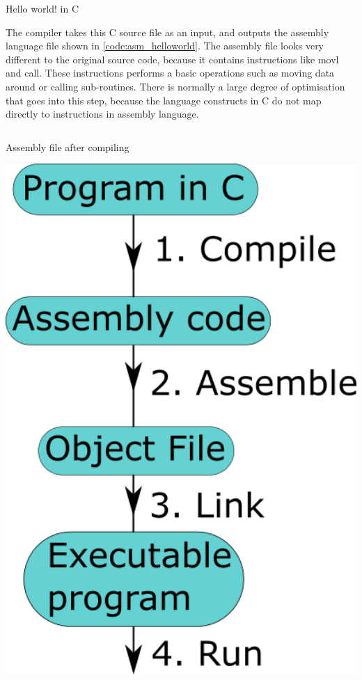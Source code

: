 \noindent \begin{minipage}{0.65\textwidth}
\begin{listing}[H]
   \inputminted{c}{code/asm/c_helloworld.txt}
   \caption{Hello world! in C}
   \label{code:c_helloworld}
\end{listing}

The compiler takes this C source file as an input, and outputs the assembly language file shown in \autoref{code:asm_helloworld}. The assembly file looks very different to the original source code, because it contains instructions like movl and call. These instructions performs a basic operations such as moving data around or calling sub-routines. There is normally a large degree of optimisation that goes into this step, because the language constructs in C do not map directly to instructions in assembly language. 

\begin{listing}[H]
   \inputminted[firstline=8, lastline=22]{gas}{code/asm/c_helloworld.x86_64.txt}
   \caption{Assembly file after compiling}
   \label{code:asm_helloworld}
\end{listing}
\end{minipage} \hfill
%
\begin{minipage}{0.3\textwidth}
    \centering
    \includegraphics[width=1.1\textwidth]{figures/impl/compileassemblelinkrun.png}
    \label{fig:compileasslinkrun}
\end{minipage}

